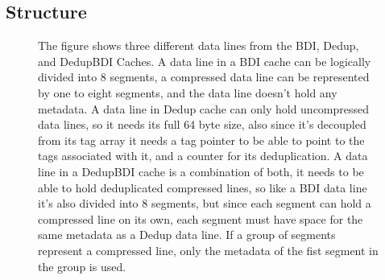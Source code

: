 \subsection{Structure}
\label{ssec:DedupBDIStructure}
\begin{figure}
    \label{fig:DedupBDI_Data}
    \caption[DedupBDI Data Array]{The figure shows three different data lines from the BDI, Dedup, and DedupBDI Caches. A data line in a BDI cache can be logically divided into 8 segments, a compressed data line can be represented by one to eight segments, and the data line doesn't hold any metadata. A data line in Dedup cache can only hold uncompressed data lines, so it needs its full 64 byte size, also since it's decoupled from its tag array it needs a tag pointer to be able to point to the tags associated with it, and a counter for its deduplication. A data line in a DedupBDI cache is a combination of both, it needs to be able to hold deduplicated compressed lines, so like a BDI data line it's also divided into 8 segments, but since each segment can hold a compressed line on its own, each segment must have space for the same metadata as a Dedup data line. If a group of segments represent a compressed line, only the metadata of the fist segment in the group is used.}
\end{figure}
